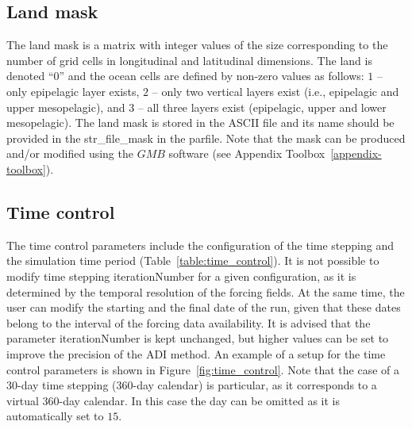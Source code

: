 \subsection{Land mask}
\label{sec:land_mask}

The land mask is a matrix with integer values of the size corresponding to the number of grid cells in longitudinal and latitudinal dimensions. The land is denoted ``$0$'' and the ocean cells are defined by non-zero values as follows: $1$ -- only epipelagic layer exists, $2$ -- only two vertical layers exist (i.e., epipelagic and upper mesopelagic), and $3$ -- all three layers exist (epipelagic, upper and lower mesopelagic). The land mask is stored in the ASCII file and its name should be provided in the \textcolor{BrickRed}{{\ttfamily str\_file\_mask}} in the parfile. Note that the mask can be produced and/or modified using the $GMB$ software (see Appendix Toolbox~\ref{appendix-toolbox}). \\

  
\subsection{Time control} 
The time control parameters include the configuration of the time stepping and the simulation time period (Table~\ref{table:time_control}). It is not possible to modify time stepping {\ttfamily iterationNumber} for a given configuration, as it is determined by the temporal resolution of the forcing fields. At the same time, the user can modify the starting and the final date of the run, given that these dates belong to the interval of the forcing data availability. It is advised that the parameter {\ttfamily iterationNumber} is kept unchanged, but higher values can be set to improve the precision of the ADI method. An example of a setup for the time control parameters is shown in Figure~\ref{fig:time_control}. Note that the case of a $30$-day time stepping ($360$-day calendar) is particular, as it corresponds to a virtual $360$-day calendar. In this case the day can be omitted as it is automatically set to $15$.

